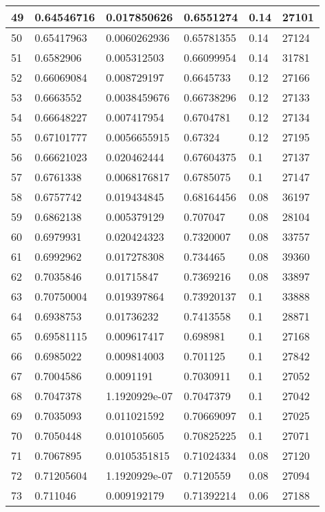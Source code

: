 \begin{longtable}{|l|l|l|l|l|l|}
49 & 0.64546716 & 0.017850626 & 0.6551274 & 0.14 & 27101 \\ \hline 
50 & 0.65417963 & 0.0060262936 & 0.65781355 & 0.14 & 27124 \\ \hline 
51 & 0.6582906 & 0.005312503 & 0.66099954 & 0.14 & 31781 \\ \hline 
52 & 0.66069084 & 0.008729197 & 0.6645733 & 0.12 & 27166 \\ \hline 
53 & 0.6663552 & 0.0038459676 & 0.66738296 & 0.12 & 27133 \\ \hline 
54 & 0.66648227 & 0.007417954 & 0.6704781 & 0.12 & 27134 \\ \hline 
55 & 0.67101777 & 0.0056655915 & 0.67324 & 0.12 & 27195 \\ \hline 
56 & 0.66621023 & 0.020462444 & 0.67604375 & 0.1 & 27137 \\ \hline 
57 & 0.6761338 & 0.0068176817 & 0.6785075 & 0.1 & 27147 \\ \hline 
58 & 0.6757742 & 0.019434845 & 0.68164456 & 0.08 & 36197 \\ \hline 
59 & 0.6862138 & 0.005379129 & 0.707047 & 0.08 & 28104 \\ \hline 
60 & 0.6979931 & 0.020424323 & 0.7320007 & 0.08 & 33757 \\ \hline 
61 & 0.6992962 & 0.017278308 & 0.734465 & 0.08 & 39360 \\ \hline 
62 & 0.7035846 & 0.01715847 & 0.7369216 & 0.08 & 33897 \\ \hline 
63 & 0.70750004 & 0.019397864 & 0.73920137 & 0.1 & 33888 \\ \hline 
64 & 0.6938753 & 0.01736232 & 0.7413558 & 0.1 & 28871 \\ \hline 
65 & 0.69581115 & 0.009617417 & 0.698981 & 0.1 & 27168 \\ \hline 
66 & 0.6985022 & 0.009814003 & 0.701125 & 0.1 & 27842 \\ \hline 
67 & 0.7004586 & 0.0091191 & 0.7030911 & 0.1 & 27052 \\ \hline 
68 & 0.7047378 & 1.1920929e-07 & 0.7047379 & 0.1 & 27042 \\ \hline 
69 & 0.7035093 & 0.011021592 & 0.70669097 & 0.1 & 27025 \\ \hline 
70 & 0.7050448 & 0.010105605 & 0.70825225 & 0.1 & 27071 \\ \hline 
71 & 0.7067895 & 0.0105351815 & 0.71024334 & 0.08 & 27120 \\ \hline 
72 & 0.71205604 & 1.1920929e-07 & 0.7120559 & 0.08 & 27094 \\ \hline 
73 & 0.711046 & 0.009192179 & 0.71392214 & 0.06 & 27188 \\ \hline 

\end{longtable}
